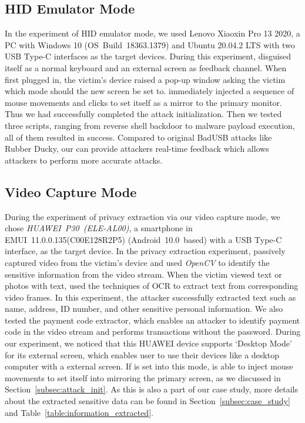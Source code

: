 \subsection{HID Emulator Mode}

In the experiment of HID emulator mode, we used {Lenovo Xiaoxin Pro 13
2020}, a PC with Windows 10 \mbox{(OS Build 18363.1379)} and Ubuntu 20.04.2 LTS with two \ac{USB} Type-C interfaces as the
target devices. During this experiment, \tool disguised itself as a normal keyboard and an external screen as feedback channel. When first plugged in, the victim's device raised a pop-up window asking the victim which mode should the new screen be set to. \tool immediately injected a sequence of mouse movements and clicks to set itself as a mirror to the primary monitor. Thus we had successfully completed the attack initialization. Then we tested three scripts, ranging from reverse shell backdoor to malware payload execution, all of them resulted in success. Compared to original BadUSB attacks like Rubber Ducky, our \tool can provide attackers real-time feedback which allows attackers to perform more accurate attacks.


\subsection{Video Capture Mode}

During the experiment of privacy extraction via our video capture mode, we chose \mbox{\textit{HUAWEI P30 (ELE-AL00)}}, a
smartphone in \mbox{EMUI 11.0.0.135(C00E128R2P5)} \mbox{(Android 10.0 based)} with a \ac{USB} Type-C interface, as the
target device. In the privacy extraction experiment, \tool passively captured video
from the victim's device and used \textit{OpenCV} to identify the sensitive
information from the video stream.  When the victim viewed text or photos with
text, \tool used the techniques of \ac{OCR}  to
extract text from corresponding video frames. In this experiment, the attacker
successfully extracted text such as name, address, ID number, and other sensitive
personal information. We also tested the payment code extractor, which enables
an attacker to identify payment code in the video stream and performs transactions
without the password. During our experiment, we noticed that this HUAWEI device supports `Desktop Mode'
for its external screen, which enables user to use their devices like a desktop computer with a external screen.
If \tool is set into this mode, \tool is able to inject mouse movements to set itself into mirroring the primary screen, as we discussed in Section~\ref{subsec:attack_init}.
As this is also a part of our case study, more details about
the extracted sensitive data can be found in Section~\ref{subsec:case_study} and
Table~\ref{table:information_extracted}.

